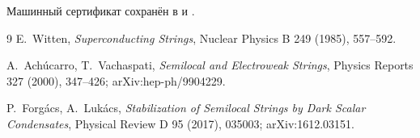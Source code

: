Машинный сертификат сохранён в
 и
.

\begin{thebibliography}{9}
E.~Witten,
\emph{Superconducting Strings},
Nuclear Physics B 249 (1985), 557--592.

A.~Ach\'ucarro, T.~Vachaspati,
\emph{Semilocal and Electroweak Strings},
Physics Reports 327 (2000), 347--426; arXiv:hep-ph/9904229.

P.~Forg\'acs, A.~Luk\'acs,
\emph{Stabilization of Semilocal Strings by Dark Scalar Condensates},
Physical Review D 95 (2017), 035003; arXiv:1612.03151.
\end{thebibliography}